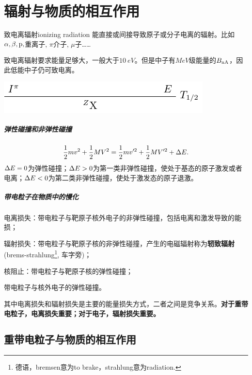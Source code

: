 \chapter{辐射与物质的相互作用}

\begin{definition}{致电离辐射}{ionizing radiation}
	能直接或间接导致原子或分子电离的辐射。比如$\alpha,\beta,\mathrm p,$重离子, $\pi$介子, $\mu$子……
\end{definition}
致电离辐射要求能量足够大，一般大于$\SI{10}{eV}$。但是中子有$\si{MeV}$级能量的$B_{\mathrm n\mathrm{A}}$，因此低能中子仍可致电离。
\begin{center}
	\includegraphics[page=13]{figures/tikz/layouts.pdf}
\end{center}
\paragraph{弹性碰撞和非弹性碰撞}
\[
	\frac12mv^2+\frac12MV^2=\frac12mv'^2+\frac12MV'^2+\Delta E.
\]
$\Delta E=0$为弹性碰撞；$\Delta E>0$为第一类非弹性碰撞，使处于基态的原子激发或者电离；$\Delta E<0$为第二类非弹性碰撞，使处于激发态的原子退激。
\paragraph{带电粒子在物质中的慢化}
\begin{compactenum}
	\item 电离损失：带电粒子与靶原子核外电子的非弹性碰撞，包括电离和激发导致的能损；
	\item 辐射损失：带电粒子与靶原子核的非弹性碰撞，产生的电磁辐射称为\textbf{轫致辐射}(brems-strahlung\footnote{德语，bremsen意为to brake，strahlung意为radiation.}, 车字旁)；
	\item 核阻止：带电粒子与靶原子核的弹性碰撞；
	\item 带电粒子与核外电子的弹性碰撞。
\end{compactenum}
其中电离损失和辐射损失是主要的能量损失方式，二者之间是竞争关系。\textbf{对于重带电粒子，电离损失重要；对于电子，辐射损失重要。}

\section{重带电粒子与物质的相互作用}

